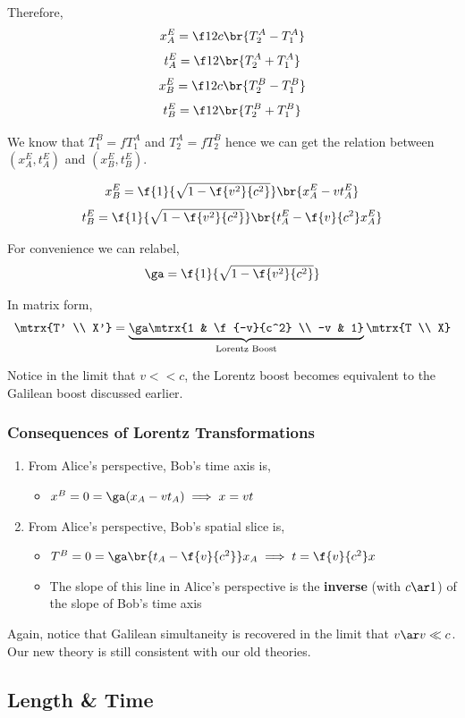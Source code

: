 \documentclass{article}
\begin{document}
Therefore,
\[ x_A^E = \f12 c \br{T_2^A - T_1^A} \]
\[ t_A^E = \f12 \br{T_2^A + T_1^A} \]
\[ x_B^E = \f12 c \br{T_2^B - T_1^B} \]
\[ t_B^E = \f12 \br{T_2^B + T_1^B} \]

We know that $T_1^B = f T_1^A$ and $T_2^A = f T_2^B$ hence we can get the relation between $(x_A^E, t_A^E)$ and $(x_B^E, t_B^E)$.

\[ x_B^E = \f{1}{\sqrt{1 - \f{v^2}{c^2}}} \br{x_A^E - vt_A^E} \]
\[ t_B^E = \f{1}{\sqrt{1 - \f{v^2}{c^2}}} \br{t_A^E - \f{v}{c^2}x_A^E} \]

For convenience we can relabel,
\[ \ga =  \f{1}{\sqrt{1 - \f{v^2}{c^2}}} \]

In matrix form,
\[ \mtrx{T' \\ X'} = \underbrace{\ga \mtrx{1 & \f{-v}{c^2} \\ -v & 1}}_{\text{Lorentz Boost}} \mtrx{T \\ X}\]

Notice in the limit that $v << c$, the Lorentz boost becomes equivalent to the Galilean boost discussed earlier.

\subsubsection{Consequences of Lorentz Transformations}

\begin{enumerate}
    \item From Alice's perspective, Bob's time axis is,
    \begin{itemize}
        \item $x^B = 0 = \ga (x_A - vt_A) \implies x = vt$
    \end{itemize}
    \item From Alice's perspective, Bob's spatial slice is,
    \begin{itemize}
        \item $T^B = 0 = \ga \br{t_A - \f{v}{c^2}} x_A \implies t = \f{v}{c^2} x$
        \item The slope of this line in Alice's perspective is the \textbf{inverse} (with $c \ar 1$) of the slope of Bob's time axis
    \end{itemize}
\end{enumerate}

Again, notice that Galilean simultaneity is recovered in the limit that $v \ar v \ll c$. Our new theory is still consistent with our old theories.

\subsection{Length \& Time}
\end{document}
